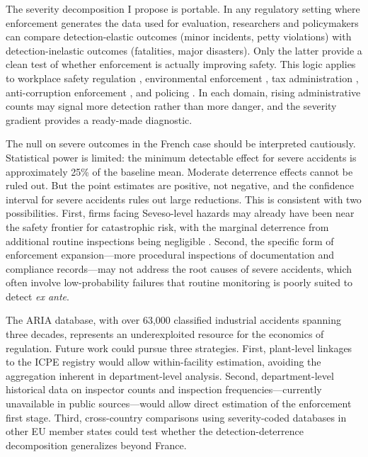 \documentclass[12pt]{article}
\begin{document}
The severity decomposition I propose is portable. In any regulatory setting where enforcement generates the data used for evaluation, researchers and policymakers can compare detection-elastic outcomes (minor incidents, petty violations) with detection-inelastic outcomes (fatalities, major disasters). Only the latter provide a clean test of whether enforcement is actually improving safety. This logic applies to workplace safety regulation \citep{gray1993,gray1998,johnson2020}, environmental enforcement \citep{shimshack2007,bennear2007}, tax administration \citep{alm2012}, anti-corruption enforcement \citep{fisman2017}, and policing \citep{levitt1997,chalfin2018}. In each domain, rising administrative counts may signal more detection rather than more danger, and the severity gradient provides a ready-made diagnostic.

The null on severe outcomes in the French case should be interpreted cautiously. Statistical power is limited: the minimum detectable effect for severe accidents is approximately 25\% of the baseline mean. Moderate deterrence effects cannot be ruled out. But the point estimates are positive, not negative, and the confidence interval for severe accidents rules out large reductions. This is consistent with two possibilities. First, firms facing Seveso-level hazards may already have been near the safety frontier for catastrophic risk, with the marginal deterrence from additional routine inspections being negligible \citep{polinsky2000}. Second, the specific form of enforcement expansion---more procedural inspections of documentation and compliance records---may not address the root causes of severe accidents, which often involve low-probability failures that routine monitoring is poorly suited to detect \textit{ex ante}.

The ARIA database, with over 63,000 classified industrial accidents spanning three decades, represents an underexploited resource for the economics of regulation. Future work could pursue three strategies. First, plant-level linkages to the ICPE registry would allow within-facility estimation, avoiding the aggregation inherent in department-level analysis. Second, department-level historical data on inspector counts and inspection frequencies---currently unavailable in public sources---would allow direct estimation of the enforcement first stage. Third, cross-country comparisons using severity-coded databases in other EU member states could test whether the detection-deterrence decomposition generalizes beyond France.
\end{document}
